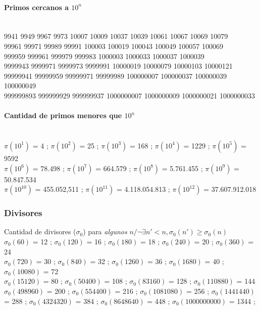 \paragraph{Primos cercanos a $10^n$}\ \\
9941 9949 9967 9973 10007 10009 10037 10039 10061 10067 10069 10079\\
99961 99971 99989 99991 100003 100019 100043 100049 100057 100069\\
999959 999961 999979 999983 1000003 1000033 1000037 1000039\\
9999943 9999971 9999973 9999991 10000019 10000079 10000103 10000121\\
99999941 99999959 99999971 99999989 100000007 100000037 100000039 100000049\\
999999893 999999929 999999937 1000000007 1000000009 1000000021 1000000033

\paragraph{Cantidad de primos menores que $10^n$}\ \\
$\pi(10^1)$ = 4 ;
$\pi(10^2)$ = 25 ;
$\pi(10^3)$ = 168 ;
$\pi(10^4)$ = 1229 ;
$\pi(10^5)$ = 9592 \\
$\pi(10^6)$ = 78.498 ;
$\pi(10^7)$ = 664.579 ;
$\pi(10^8)$ = 5.761.455 ;
$\pi(10^9)$ = 50.847.534 \\
$\pi(10^{10})$ = 455.052,511 ;
$\pi(10^{11})$ = 4.118.054.813 ;
$\pi(10^{12})$ = 37.607.912.018%

\subsubsection{Divisores}
Cantidad de divisores ($\sigma_0$) para \emph{algunos} $n / \neg\exists n'<n, \sigma_0(n') \geqslant \sigma_0(n)$ \\
$\sigma_0(60)$ = 12 ; $\sigma_0(120)$ = 16 ; $\sigma_0(180)$ = 18 ; $\sigma_0(240)$ = 20 ; $\sigma_0(360)$ = 24 \\
$\sigma_0(720)$ = 30 ; $\sigma_0(840)$ = 32 ; $\sigma_0(1260)$ = 36 ; $\sigma_0(1680)$ = 40 ; $\sigma_0(10080)$ = 72 \\ $\sigma_0(15120)$ = 80 ; $\sigma_0(50400)$ = 108 ; $\sigma_0(83160)$ = 128 ; $\sigma_0(110880)$ = 144 \\
$\sigma_0(498960)$ = 200 ; $\sigma_0(554400)$ = 216 ; $\sigma_0(1081080)$ = 256 ; $\sigma_0(1441440)$ = 288 ; $\sigma_0(4324320)$ = 384 ; $\sigma_0(8648640)$ = 448 ;
$\sigma_0(1000000000)$ = 1344 ;

